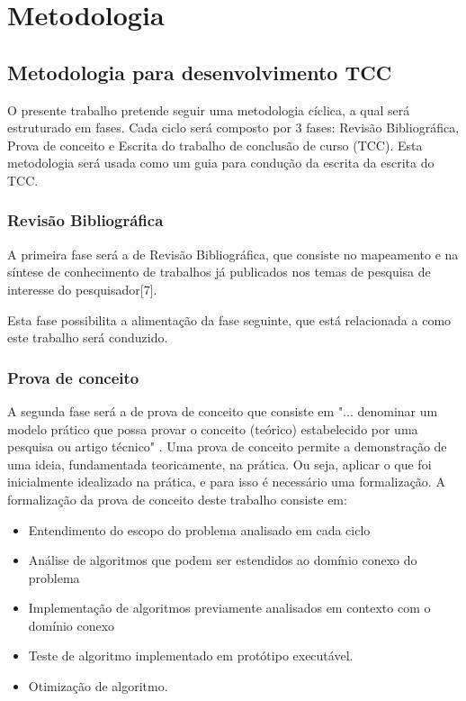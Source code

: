 \chapter{Metodologia}



\section{Metodologia para desenvolvimento TCC} %

O presente trabalho pretende seguir uma metodologia cíclica, a qual será
estruturado em fases. Cada ciclo será composto por 3 fases: Revisão Bibliográfica, Prova de conceito e Escrita do trabalho de conclusão de curso (TCC). 
Esta metodologia será usada como um guia para condução da escrita da escrita do TCC.

\subsection{Revisão Bibliográfica}
A primeira fase será a de Revisão Bibliográfica, que
consiste no mapeamento e na síntese de conhecimento de trabalhos já publicados nos temas
de pesquisa de interesse do pesquisador[7]. 

Esta fase possibilita a alimentação da fase seguinte, que está relacionada a como este trabalho será conduzido.

\subsection{Prova de conceito}
A segunda fase será a de prova de conceito que consiste em "... denominar um
modelo prático que possa provar o conceito (teórico) estabelecido por uma pesquisa ou
artigo técnico" \cite{poc}. Uma prova de conceito permite a demonstração de uma ideia, fundamentada teoricamente, na prática. Ou seja, aplicar o que foi inicialmente idealizado na prática, e para isso é necessário uma formalização.
A formalização da prova de conceito deste trabalho consiste em:
\begin{itemize}
	\item Entendimento do escopo do problema analisado em cada ciclo
	\item Análise de algoritmos que podem ser estendidos ao domínio conexo do problema
	\item Implementação de algoritmos previamente analisados em contexto com o domínio conexo
	\item Teste de algoritmo implementado em protótipo executável. 
	\item Otimização de algoritmo.
\end{itemize}  

